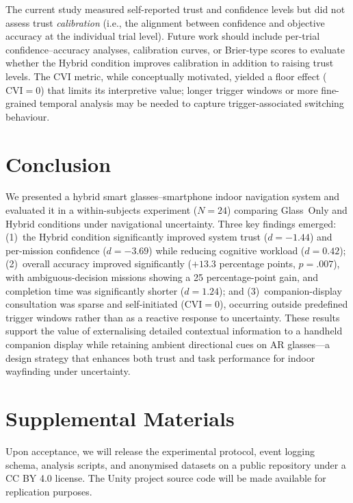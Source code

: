 \documentclass[review]{vgtc}           %
\begin{document}
The current study measured self-reported trust and confidence levels
but did not assess trust \emph{calibration} (i.e., the alignment
between confidence and objective accuracy at the individual trial
level). Future work should include per-trial confidence--accuracy
analyses, calibration curves, or Brier-type scores to evaluate
whether the Hybrid condition improves calibration in addition to
raising trust levels. The CVI metric, while conceptually motivated,
yielded a floor effect ($\text{CVI} = 0$) that limits its
interpretive value; longer trigger windows or more fine-grained
temporal analysis may be needed to capture trigger-associated
switching behaviour.



\section{Conclusion}

We presented a hybrid smart glasses--smartphone indoor navigation
system and evaluated it in a within-subjects experiment ($N{=}24$)
comparing Glass~Only and Hybrid conditions under navigational
uncertainty. Three key findings emerged: (1)~the Hybrid condition
significantly improved system trust ($d = -1.44$) and per-mission
confidence ($d = -3.69$) while reducing cognitive workload
($d = 0.42$); (2)~overall accuracy improved significantly
($+13.3$ percentage points, $p = .007$), with ambiguous-decision
missions showing a 25 percentage-point gain, and completion time was
significantly shorter ($d = 1.24$); and (3)~companion-display consultation was sparse and self-initiated
(CVI${=}0$), occurring outside predefined trigger windows rather than
as a reactive response to uncertainty. These results support the value of
externalising detailed contextual information to a handheld companion
display while retaining ambient directional cues on AR
glasses---a design strategy that enhances both trust and task
performance for indoor wayfinding under uncertainty.



\section*{Supplemental Materials}
\label{sec:supplemental_materials}

Upon acceptance, we will release the experimental protocol, event
logging schema, analysis scripts, and anonymised datasets on a
public repository under a CC BY 4.0 license. The Unity project
source code will be made available for replication purposes.





\balance


\end{document}
